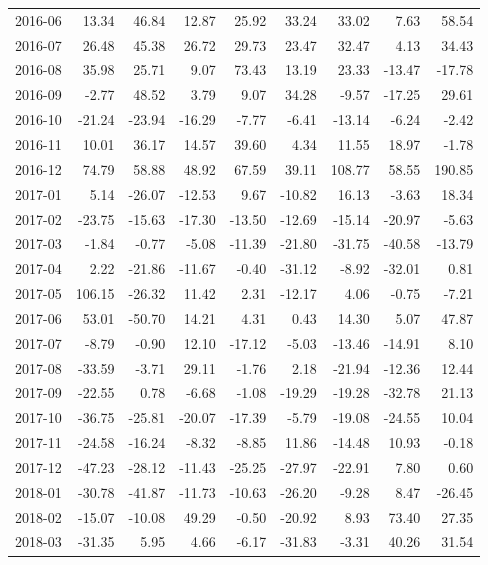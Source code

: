 \begin{table}[ht]
\begin{tabular}{lrrrrrrrr}
  2016-06 & 13.34 & 46.84 & 12.87 & 25.92 & 33.24 & 33.02 & 7.63 & 58.54 \\ 
  2016-07 & 26.48 & 45.38 & 26.72 & 29.73 & 23.47 & 32.47 & 4.13 & 34.43 \\ 
  2016-08 & 35.98 & 25.71 & 9.07 & 73.43 & 13.19 & 23.33 & -13.47 & -17.78 \\ 
  2016-09 & -2.77 & 48.52 & 3.79 & 9.07 & 34.28 & -9.57 & -17.25 & 29.61 \\ 
  2016-10 & -21.24 & -23.94 & -16.29 & -7.77 & -6.41 & -13.14 & -6.24 & -2.42 \\ 
  2016-11 & 10.01 & 36.17 & 14.57 & 39.60 & 4.34 & 11.55 & 18.97 & -1.78 \\ 
  2016-12 & 74.79 & 58.88 & 48.92 & 67.59 & 39.11 & 108.77 & 58.55 & 190.85 \\ 
  2017-01 & 5.14 & -26.07 & -12.53 & 9.67 & -10.82 & 16.13 & -3.63 & 18.34 \\ 
  2017-02 & -23.75 & -15.63 & -17.30 & -13.50 & -12.69 & -15.14 & -20.97 & -5.63 \\ 
  2017-03 & -1.84 & -0.77 & -5.08 & -11.39 & -21.80 & -31.75 & -40.58 & -13.79 \\ 
  2017-04 & 2.22 & -21.86 & -11.67 & -0.40 & -31.12 & -8.92 & -32.01 & 0.81 \\ 
  2017-05 & 106.15 & -26.32 & 11.42 & 2.31 & -12.17 & 4.06 & -0.75 & -7.21 \\ 
  2017-06 & 53.01 & -50.70 & 14.21 & 4.31 & 0.43 & 14.30 & 5.07 & 47.87 \\ 
  2017-07 & -8.79 & -0.90 & 12.10 & -17.12 & -5.03 & -13.46 & -14.91 & 8.10 \\ 
  2017-08 & -33.59 & -3.71 & 29.11 & -1.76 & 2.18 & -21.94 & -12.36 & 12.44 \\ 
  2017-09 & -22.55 & 0.78 & -6.68 & -1.08 & -19.29 & -19.28 & -32.78 & 21.13 \\ 
  2017-10 & -36.75 & -25.81 & -20.07 & -17.39 & -5.79 & -19.08 & -24.55 & 10.04 \\ 
  2017-11 & -24.58 & -16.24 & -8.32 & -8.85 & 11.86 & -14.48 & 10.93 & -0.18 \\ 
  2017-12 & -47.23 & -28.12 & -11.43 & -25.25 & -27.97 & -22.91 & 7.80 & 0.60 \\ 
  2018-01 & -30.78 & -41.87 & -11.73 & -10.63 & -26.20 & -9.28 & 8.47 & -26.45 \\ 
  2018-02 & -15.07 & -10.08 & 49.29 & -0.50 & -20.92 & 8.93 & 73.40 & 27.35 \\ 
  2018-03 & -31.35 & 5.95 & 4.66 & -6.17 & -31.83 & -3.31 & 40.26 & 31.54 \\ 

\end{tabular}
\end{table}
